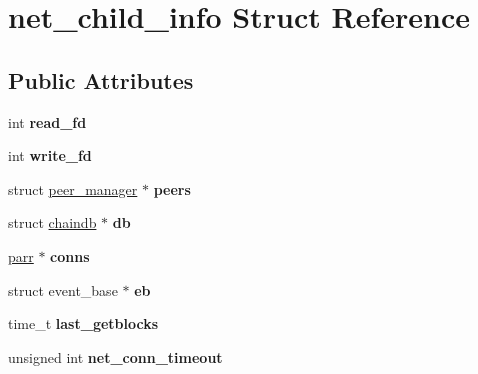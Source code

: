 \hypertarget{structnet__child__info}{\section{net\-\_\-child\-\_\-info Struct Reference}
\label{structnet__child__info}
}
\subsection*{Public Attributes}
\begin{DoxyCompactItemize}
\item 
\hypertarget{structnet__child__info_aeb7c2e6b362b783a45f642b6657adb79}{int {\bfseries read\-\_\-fd}}\label{structnet__child__info_aeb7c2e6b362b783a45f642b6657adb79}

\item 
\hypertarget{structnet__child__info_a20f055e9469d205f63767478eb8b43d3}{int {\bfseries write\-\_\-fd}}\label{structnet__child__info_a20f055e9469d205f63767478eb8b43d3}

\item 
\hypertarget{structnet__child__info_a7d118ac5f9e703fc6683c85f924bcd23}{struct \hyperlink{structpeer__manager}{peer\-\_\-manager} $\ast$ {\bfseries peers}}\label{structnet__child__info_a7d118ac5f9e703fc6683c85f924bcd23}

\item 
\hypertarget{structnet__child__info_a9489d356f08ad1d66c3e9939a3545c54}{struct \hyperlink{structchaindb}{chaindb} $\ast$ {\bfseries db}}\label{structnet__child__info_a9489d356f08ad1d66c3e9939a3545c54}

\item 
\hypertarget{structnet__child__info_a6127de1099cbce59bc0d5c405999203b}{\hyperlink{structparr}{parr} $\ast$ {\bfseries conns}}\label{structnet__child__info_a6127de1099cbce59bc0d5c405999203b}

\item 
\hypertarget{structnet__child__info_a75b27e2f53a4706ccfb9b5ca876f223e}{struct event\-\_\-base $\ast$ {\bfseries eb}}\label{structnet__child__info_a75b27e2f53a4706ccfb9b5ca876f223e}

\item 
\hypertarget{structnet__child__info_a26f00d62cd7687ce83caad7377596b67}{time\-\_\-t {\bfseries last\-\_\-getblocks}}\label{structnet__child__info_a26f00d62cd7687ce83caad7377596b67}

\item 
\hypertarget{structnet__child__info_a2aec83e11d8c71f10fe1288e6648a800}{unsigned int {\bfseries net\-\_\-conn\-\_\-timeout}}\label{structnet__child__info_a2aec83e11d8c71f10fe1288e6648a800}


\end{DoxyCompactItemize}
